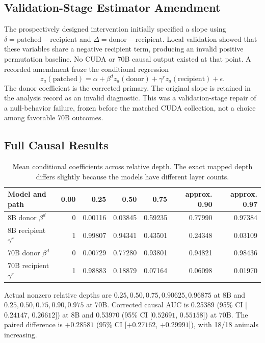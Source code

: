 \documentclass[letterpaper]{article}
\newcommand{\CI}[2]{95\% CI [#1, #2]}
\begin{document}
\subsection{Validation-Stage Estimator Amendment}

The prospectively designed intervention initially specified a slope using
$\delta=\mathrm{patched}-\mathrm{recipient}$ and
$\Delta=\mathrm{donor}-\mathrm{recipient}$. Local validation showed that these
variables share a negative recipient term, producing an invalid positive
permutation baseline. No CUDA or 70B causal output existed at that point. A
recorded amendment froze the conditional regression
\begin{equation}
z_a(\mathrm{patched})=\alpha+\beta^d z_a(\mathrm{donor})
+\gamma^r z_a(\mathrm{recipient})+\epsilon.
\end{equation}
The donor coefficient is the corrected primary. The original slope is retained
in the analysis record as an invalid diagnostic. This was a validation-stage
repair of a null-behavior failure, frozen before the matched CUDA collection,
not a choice among favorable 70B outcomes.

\subsection{Full Causal Results}

\begin{table}[t]
\centering
\caption{Mean conditional coefficients across relative depth. The exact mapped
depth differs slightly because the models have different layer counts.}
\label{tab:causal}
\begin{tabular}{lrrrrrr}
\toprule
Model and path & 0.00 & 0.25 & 0.50 & 0.75 & approx. 0.90 & approx. 0.97 \\
\midrule
8B donor $\beta^d$ & 0 & 0.00116 & 0.03845 & 0.59235 & 0.77990 & 0.97384 \\
8B recipient $\gamma^r$ & 1 & 0.99807 & 0.94341 & 0.43501 & 0.24348 & 0.03109 \\
70B donor $\beta^d$ & 0 & 0.00729 & 0.77280 & 0.93801 & 0.94821 & 0.98436 \\
70B recipient $\gamma^r$ & 1 & 0.98883 & 0.18879 & 0.07164 & 0.06098 & 0.01970 \\
\bottomrule
\end{tabular}
\end{table}

Actual nonzero relative depths are
$0.25,0.50,0.75,0.90625,0.96875$ at 8B and
$0.25,0.50,0.75,0.90,0.975$ at 70B. Corrected causal AUC is 0.25389
(\CI{$0.24147$}{$0.26612$}) at 8B and 0.53970
(\CI{$0.52691$}{$0.55158$}) at 70B. The paired difference is $+0.28581$
(\CI{$+0.27162$}{$+0.29991$}), with 18/18 animals increasing.
\end{document}
